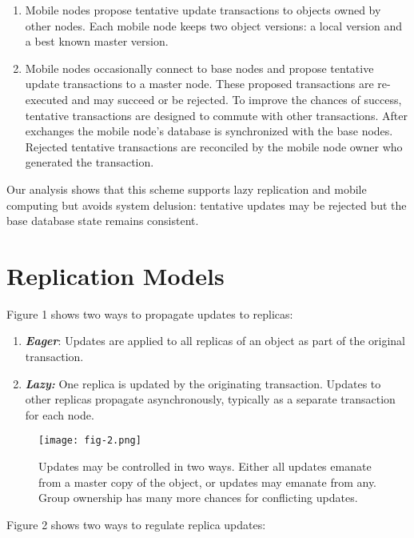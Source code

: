 \documentclass[a4paper,11pt,twoside,openright]{article}
\begin{document}
\begin{enumerate}
\def\labelenumi{\arabic{enumi}.}
\item
  Mobile nodes propose tentative update transactions to objects owned by
  other nodes. Each mobile node keeps two object versions: a local
  version and a best known master version.
\item
  Mobile nodes occasionally connect to base nodes and propose tentative
  update transactions to a master node. These proposed transactions are
  re-executed and may succeed or be rejected. To improve the chances of
  success, tentative transactions are designed to commute with other
  transactions. After exchanges the mobile node's database is
  synchronized with the base nodes. Rejected tentative transactions are
  reconciled by the mobile node owner who generated the transaction.
\end{enumerate}

Our analysis shows that this scheme supports lazy replication and mobile
computing but avoids system delusion: tentative updates may be rejected
but the base database state remains consistent.

\section{Replication Models}

Figure 1 shows two ways to propagate updates to replicas:

\begin{enumerate}
\def\labelenumi{\arabic{enumi}.}
\item
  \emph{\textbf{Eager}}: Updates are applied to all replicas of an
  object as part of the original transaction.
\item
  \emph{\textbf{Lazy:}} One replica is updated by the originating
  transaction. Updates to other replicas propagate asynchronously,
  typically as a separate transaction for each node.
\end{enumerate}

\begin{figure}
  \centering
  \texttt{[image: fig-2.png]}
  \caption{Updates may be controlled in two ways. Either all updates
emanate from a master copy of the object, or updates may emanate from
any. Group ownership has many more chances for conflicting updates.}
\end{figure}

Figure 2 shows two ways to regulate replica updates:
\end{document}
